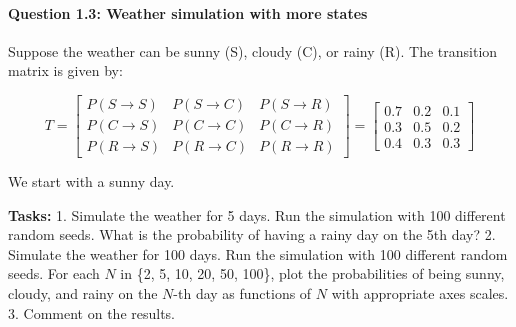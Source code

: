 \documentclass[11pt]{article}
\begin{document}
    \paragraph{Question 1.3: Weather simulation with more
states}\label{question-1.3-weather-simulation-with-more-states}

Suppose the weather can be sunny (S), cloudy (C), or rainy (R). The
transition matrix is given by:

\[
T =
\begin{bmatrix}
P(S \to S) & P(S \to C) & P(S \to R) \\
P(C \to S) & P(C \to C) & P(C \to R) \\
P(R \to S) & P(R \to C) & P(R \to R)
\end{bmatrix}
=
\begin{bmatrix}
0.7 & 0.2 & 0.1 \\
0.3 & 0.5 & 0.2 \\
0.4 & 0.3 & 0.3
\end{bmatrix}
\]

We start with a sunny day.

\textbf{Tasks:} 1. Simulate the weather for 5 days. Run the simulation
with 100 different random seeds. What is the probability of having a
rainy day on the 5th day? 2. Simulate the weather for 100 days. Run the
simulation with 100 different random seeds. For each \(N\) in \{2, 5,
10, 20, 50, 100\}, plot the probabilities of being sunny, cloudy, and
rainy on the \(N\)-th day as functions of \(N\) with appropriate axes
scales. 3. Comment on the results.
\end{document}
